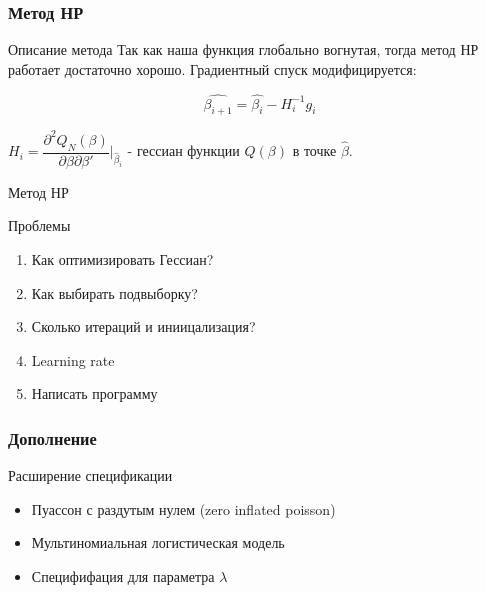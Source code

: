 \documentclass[unicode]{beamer}
\begin{document}
\begin{frame}
	\frametitle{Метод НР}
	\begin{block}{Описание метода}
		Так как наша функция глобально вогнутая, тогда метод НР работает достаточно хорошо. Градиентный спуск модифицируется:
		
		
		$$\hat{\beta_{i+1}} = \hat{\beta_{i}} - H^{-1}_{i} g_{i} $$ \pause
		
		
		
		$H_i =  \dfrac{\partial^2 Q_N(\beta)}{\partial \beta \partial \beta'}\bigg|_{\hat{\beta}_i}$ - гессиан функции $Q(\beta)$ в точке $\hat{\beta}$.
		
	\end{block}
	
\end{frame}
\begin{frame}{Метод НР}
\begin{alertblock}{Проблемы}		
	\begin{enumerate}
		\item Как оптимизировать Гессиан? \pause
		
		\item Как выбирать подвыборку? \pause
		
		\item Сколько итераций и иниицализация? \pause
		
		\item Learning rate \pause
		
		\item Написать программу 
	\end{enumerate}
\end{alertblock}
\end{frame}

\begin{frame}
	\frametitle{Дополнение}
	\begin{exampleblock}{Расширение спецификации}
		\large
		\begin{itemize}
			
			\item Пуассон с раздутым нулем (zero inflated poisson)
			
			\item Мультиномиальная логистическая модель
			
			\item Специфифация для параметра $\lambda$
		\end{itemize}
	\end{exampleblock}
	
\end{frame}
\end{document}
